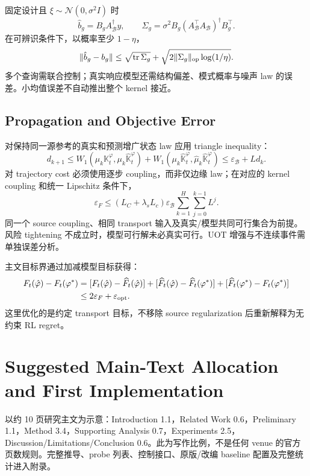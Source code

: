 \documentclass[11pt]{article}
\newcommand{\tr}{\operatorname{tr}}
\begin{document}
固定设计且 $\xi\sim\mathcal N(0,\sigma^2I)$ 时
\begin{equation}
 \hat b_g=B_gA_{\mathcal B}^\dagger y,\qquad
 \Sigma_g=\sigma^2B_g(A_{\mathcal B}^\top A_{\mathcal B})^\dagger B_g^\top.
\end{equation}
在可辨识条件下，以概率至少 $1-\eta$，
\begin{equation}
 \|\hat b_g-b_g\|\le
 \sqrt{\tr\Sigma_g}+\sqrt{2\|\Sigma_g\|_{\rm op}\log(1/\eta)}.
\end{equation}
多个查询需联合控制；真实响应模型还需结构偏差、模式概率与噪声 law 的误差。小均值误差不自动推出整个 kernel 接近。

\subsection{Propagation and Objective Error}
对保持同一源参考的真实和预测增广状态 law 应用 triangle inequality：
\begin{equation}
 d_{k+1}\le
 W_1(\mu_k\mathbb K_t^\varphi,\mu_k\widehat{\mathbb K}_t^\varphi)
 +W_1(\mu_k\widehat{\mathbb K}_t^\varphi,\hat\mu_k\widehat{\mathbb K}_t^\varphi)
 \le\varepsilon_{\mathcal B}+Ld_k.
\end{equation}
对 trajectory cost 必须使用逐步 coupling，而非仅边缘 law；在对应的 kernel coupling 和统一 Lipschitz 条件下，
\begin{equation}
 \varepsilon_F\le
 (L_C+\lambda_sL_c)\varepsilon_{\mathcal B}
 \sum_{k=1}^{H}\sum_{j=0}^{k-1}L^j.
\end{equation}
同一个 source coupling、相同 transport 输入及真实/模型共同可行集合为前提。风险 tightening 不成立时，模型可行解未必真实可行。UOT 增强与不连续事件需单独误差分析。

主文目标界通过加减模型目标获得：
\begin{align}
 F_t(\hat\varphi)-F_t(\varphi^*)
 &= [F_t(\hat\varphi)-\widehat F_t(\hat\varphi)]
 +[\widehat F_t(\hat\varphi)-\widehat F_t(\varphi^*)]
 +[\widehat F_t(\varphi^*)-F_t(\varphi^*)]\\
 &\le2\varepsilon_F+\varepsilon_{\rm opt}.
\end{align}
这里优化的是约定 transport 目标，不移除 source regularization 后重新解释为无约束 RL regret。

\section{Suggested Main-Text Allocation and First Implementation}
以约 10 页研究主文为示意：Introduction 1.1，Related Work 0.6，Preliminary 1.1，Method 3.4，Supporting Analysis 0.7，Experiments 2.5，Discussion/Limitations/Conclusion 0.6。此为写作比例，不是任何 venue 的官方页数规则。完整推导、probe 列表、控制接口、原版/改编 baseline 配置及完整统计进入附录。
\end{document}
